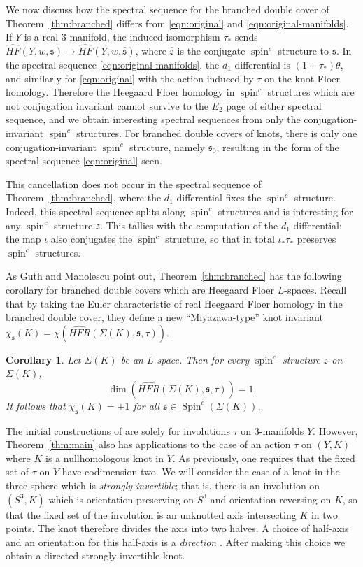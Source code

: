 \documentclass[11pt,reqno]{amsart}
\newtheorem{cor}[thm]{Corollary}
\theoremstyle{definition}
\theoremstyle{remark}
\DeclareMathOperator{\spin}{{spin}}
\DeclareMathOperator{\Spin}{{Spin}}
\newcommand{\HF}{\mathit{HF}}
\newcommand{\HFR}{\mathit{HFR}}
\newcommand{\HFRhat}{\widehat{\HFR}}
\newcommand\HFhat{\widehat{\HF}}
\numberwithin{equation}{section}
\begin{document}
We now discuss how the spectral sequence for the branched double cover of Theorem~\ref{thm:branched} differs from \eqref{eqn:original} and \eqref{eqn:original-manifolds}. If $Y$ is a real 3-manifold, the induced isomorphism $\tau_*$ sends $\HFhat(Y, w, \mathfrak s) \rightarrow \HFhat (Y, w, \overline{\mathfrak s})$, where $\overline{\mathfrak s}$ is the conjugate $\spin^c$ structure to $\mathfrak s$. In the spectral sequence \eqref{eqn:original-manifolds}, the $d_1$ differential is $(1+\tau_*)\theta$, and similarly for \eqref{eqn:original} with the action induced by $\tau$ on the knot Floer homology. Therefore the Heegaard Floer homology in $\spin^c$ structures which are not conjugation invariant cannot survive to the $E_2$ page of either spectral sequence, and we obtain interesting spectral sequences from only the conjugation-invariant $\spin^c$ structures. For branched double covers of knots, there is only one conjugation-invariant $\spin^c$ structure, namely $\mathfrak s_0$, resulting in the form of the spectral sequence \eqref{eqn:original} seen.

This cancellation does not occur in the spectral sequence of Theorem~\ref{thm:branched}, where the $d_1$ differential fixes the $\spin^c$ structure. Indeed, this spectral sequence splits along $\spin^c$ structures and is interesting for any $\spin^c$ structure $\mathfrak s$. This tallies with the computation of the $d_1$ differential: the map $\iota$ also conjugates the $\spin^c$ structure, so that in total $\iota_*\tau_*$ preserves $\spin^c$ structures.

As Guth and Manolescu point out, Theorem~\ref{thm:branched} has the following corollary for branched double covers which are Heegaard Floer $L$-spaces. Recall that by taking the Euler characteristic of real Heegaard Floer homology in the branched double cover, they define a new ``Miyazawa-type'' knot invariant $\chi_{\mathfrak s}(K) = \chi(\HFRhat(\Sigma(K), \mathfrak s, \tau)).$


\begin{cor} \label{cor:lspace} Let $\Sigma(K)$ be an $L$-space. Then for every $\spin^c$ structure $\mathfrak s$ on $\Sigma(K)$, 
%
\[ \dim\left(\HFRhat(\Sigma(K), \mathfrak s, \tau)\right) = 1.\]
%
It follows that $\chi_{\mathfrak s}(K) = \pm 1$ for all $\mathfrak s \in \Spin^c(\Sigma(K))$. \end{cor}


The initial constructions of \cite{GM:real} are solely for involutions $\tau$ on $3$-manifolds $Y$. However, Theorem~\ref{thm:main} also has applications to the case of an action $\tau$ on $(Y,K)$ where $K$ is a nullhomologous knot in $Y$. As previously, one requires that the fixed set of $\tau$ on $Y$ have codimension two. We will consider the case of a  knot in the three-sphere which is \emph{strongly invertible}; that is, there is an involution on $(S^3,K)$ which is orientation-preserving on $S^3$ and orientation-reversing on $K$, so that the fixed set of the involution is an unknotted axis intersecting $K$ in two points. The knot therefore divides the axis into two halves. A choice of half-axis and an orientation for this half-axis is a \emph{direction} \cite[Section 1]{Sakumainvertible}. After making this choice we obtain a directed strongly invertible knot.
\end{document}
